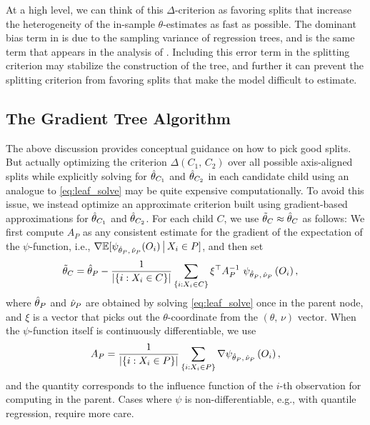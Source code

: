 \documentclass[aos]{imsart}
\theoremstyle{plain}
\theoremstyle{definition}
\theoremstyle{remark}
\begin{document}
\begin{CJK}{UTF8}{gbsn}
At a high level, we can think of this $\Delta$-criterion as favoring splits that increase the heterogeneity of the in-sample $\theta$-estimates as fast as possible. The dominant bias term in  is due to the sampling variance of regression trees, and is the same term that appears in the analysis of \citet{athey2016recursive}. Including this error term in the splitting criterion may stabilize the construction of the tree, and further it can prevent the splitting criterion
from favoring splits that make the model difficult to estimate.

\subsection{The Gradient Tree Algorithm}

The above discussion provides conceptual guidance on how to pick
good splits. But actually optimizing the
criterion $\Delta(C_1, \, C_2)$ over all possible axis-aligned splits
while explicitly solving for $\hat{\theta}_{C_1}$ and $\hat{\theta}_{C_2}$ in each candidate child
using an analogue to \eqref{eq:leaf_solve} may be quite expensive computationally.
To avoid this issue, we instead optimize an approximate criterion 
built using gradient-based approximations for $\hat{\theta}_{C_1}$ and $\hat{\theta}_{C_2}$.
For each child $C$, we use $\tilde{\theta}_C \approx \hat{\theta}_C$ as follows:
We first compute $A_P$ as any consistent estimate for the gradient of the expectation of the $\psi$-function, i.e.,
$\nabla \mathbb{E}[\psi_{\hat{\theta}_P, \, \hat{\nu}_P}(O_i) \,\big|\, X_i \in P]$, and then set
\begin{align}
\label{eq:ttheta}
&\ttheta_C = \htheta_P - \frac{1}{\abs{\cb{i : X_i \in C}}} \sum_{\cb{i : X_i \in C}} \xi^\top A^{-1}_P \ \psi_{\htheta_P, \, \hnu_P}\p{O_i},
\end{align}
where $\hat{\theta}_P$ and $\hat{\nu}_P$ are obtained by solving \eqref{eq:leaf_solve} once in the parent node,
and $\xi$ is a vector that picks out the $\theta$-coordinate from the $(\theta, \, \nu)$ vector.
When the $\psi$-function itself is continuously differentiable, we use
\begin{equation}
\label{eq:AP}
A_P= \frac{1}{\abs{\cb{i : X_i \in P}}} \sum_{\cb{i : X_i \in P}} \nabla \psi_{\htheta_P, \, \hnu_P}\p{O_i},
\end{equation}
and the quantity  corresponds
to the influence function of the $i$-th observation for computing  in the parent.
Cases where $\psi$ is non-differentiable, e.g., with quantile regression, require more care.


\end{CJK}
\end{document}
